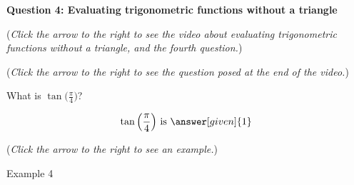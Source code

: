 \documentclass{ximera}
\begin{document}
\textbf{Question 4: Evaluating trigonometric functions
without a triangle}
\begin{question}
\begin{flushright}
{\color{blue}(\emph{Click the arrow to the right to see the video about
evaluating trigonometric functions without a triangle, and the fourth question.})}
\end{flushright}
\begin{center}
\begin{expandable}
\begin{flushright}
{\color{blue}(\emph{Click the arrow to the right to see the  question
posed at the end of the video.})}
\end{flushright}
\begin{expandable}
What is $\tan\Big(\frac{\pi}{4}\Big)$?
\begin{prompt}
\[
\tan\Big(\frac{\pi}{4}\Big)\text{ is }\answer[given]{1}
\]
\end{prompt}
\begin{flushright}
{\color{blue}(\emph{Click the arrow to the right to see an example.})}
\end{flushright}
\begin{expandable}
\begin{center}
Example 4
\end{center}
\end{expandable}
\end{expandable}
\end{expandable}
\end{center}
\end{question}
\end{document}
